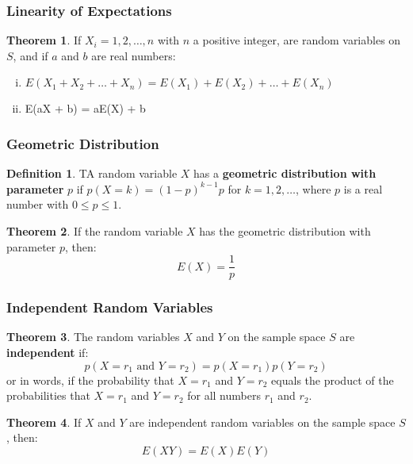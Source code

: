 \documentclass[article, 11pt]{article}
\theoremstyle{definition}
\newtheorem{theorem}{Theorem}[subsubsection]
\newtheorem{definition}{Definition}[subsubsection]
\begin{document}
    \subsubsection{Linearity of Expectations}
    \begin{theorem}
        If $X_i=1,2,\dots,n$ with $n$ a positive integer, are random variables on $S$, and if $a$ and $b$ are real numbers:
        \begin{enumerate}[(i).]
            \item $E(X_1 + X_2 + \dots + X_n) = E(X_1) + E(X_2) + \dots + E(X_n)$
            \item E(aX + b) = aE(X) + b
        \end{enumerate}
    \end{theorem}
    \subsubsection{Geometric Distribution}
    \begin{definition}
        TA random variable $X$ has a \textbf{geometric distribution with parameter} $p$ if $p(X = k) = (1-p)^{k-1}p$ for $k = 1,2,\dots$, where $p$ is a real number with $0 \leq p \leq 1$.
    \end{definition}
    \begin{theorem}
        If the random variable $X$ has the geometric distribution with parameter $p$, then:
        \begin{equation*}
            E(X) = \frac{1}{p}
        \end{equation*}
    \end{theorem}
    \subsubsection{Independent Random Variables}
    \begin{theorem}
        The random variables $X$ and $Y$ on the sample space $S$ are \textbf{independent} if:
        \begin{equation*}
            p(X=r_1 \text{ and } Y=r_2) = p(X=r_1)p(Y=r_2)
        \end{equation*}
        or in words, if the probability that $X = r_1$ and $Y = r_2$ equals the product of the probabilities that $X = r_1$ and $Y = r_2$ for all numbers $r_1$ and $r_2$.
    \end{theorem}
    \begin{theorem}
        If $X$ and $Y$ are independent random variables on the sample space $S$, then:
        \begin{equation*}
            E(XY) = E(X)E(Y)
        \end{equation*}
    \end{theorem}
\end{document}
